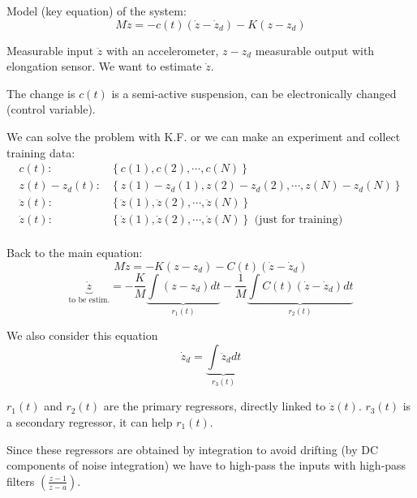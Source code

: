 \begin{exercise}
    Model (key equation) of the system:
    \[
        M\ddot{z} = -c(t)(\dot{z}-\dot{z}_d) - K(z-z_d)
    \]

    Measurable input $\ddot{z}$ with an accelerometer, $z-z_d$ measurable output with elongation sensor.
    We want to estimate $\dot{z}$.

    The change is $c(t)$ is a semi-active suspension, can be electronically changed (control variable).

    We can solve the problem with K.F. or we can make an experiment and collect training data:
    \begin{align*}
        c(t)        : & \left\{ c(1), c(2), \cdots, c(N) \right\} \\
        z(t)-z_d(t) : & \left\{ z(1)-z_d(1), z(2)-z_d(2), \cdots, z(N)-z_d(N) \right\} \\
        \ddot{z}(t) : & \left\{ \ddot{z}(1), \ddot{z}(2), \cdots, \ddot{z}(N) \right\} \\
        \dot{z}(t)  : & \left\{ \dot{z}(1), \dot{z}(2), \cdots, \dot{z}(N) \right\} \text{ (just for training)} \\
    \end{align*}


    Back to the main equation:
    \[
        M\ddot{z} = -K(z-z_d)-C(t)(\dot{z}-\dot{z}_d)
    \]
    \[
        \underbrace{\dot{z}}_{\text{to be estim.}} =
        -\frac{K}{M} \underbrace{\int (z-z_d)dt}_{r_1(t)}
        -\frac{1}{M} \underbrace{\int C(t)(\dot{z}-\dot{z}_d)dt}_{r_2(t)}
    \]

    We also consider this equation
    \[
        \dot{z}_d = \underbrace{\int \ddot{z}_d dt}_{r_3(t)}
    \]

    $r_1(t)$ and $r_2(t)$ are the primary regressors, directly linked to $\dot{z}(t)$. $r_3(t)$ is a secondary regressor, it can help $r_1(t)$.

    Since these regressors are obtained by integration to avoid drifting (by DC components of noise integration) we have to high-pass the inputs with high-pass filters $\left(\frac{z-1}{z-a}\right)$.


\end{exercise}
